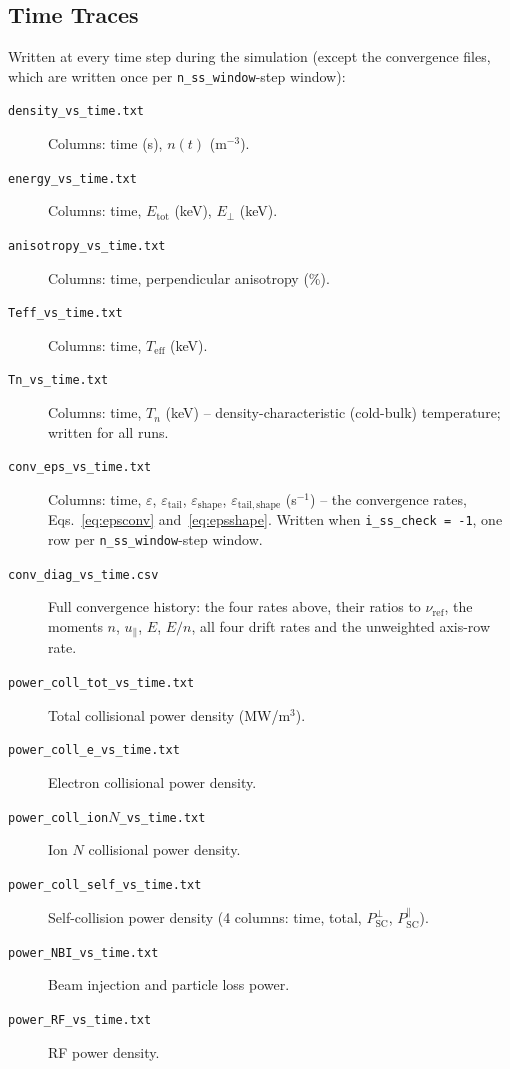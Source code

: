 \documentclass[11pt,a4paper]{article}
\begin{document}
\subsection{Time Traces}

Written at every time step during the simulation (except the convergence files,
which are written once per \texttt{n\_ss\_window}-step window):

\begin{description}
  \item[\texttt{density\_vs\_time.txt}] Columns: time (s), $n(t)$ (m$^{-3}$).
  \item[\texttt{energy\_vs\_time.txt}] Columns: time, $E_\mathrm{tot}$ (keV), $E_\perp$ (keV).
  \item[\texttt{anisotropy\_vs\_time.txt}] Columns: time, perpendicular anisotropy (\%).
  \item[\texttt{Teff\_vs\_time.txt}] Columns: time, $T_\mathrm{eff}$ (keV).
  \item[\texttt{Tn\_vs\_time.txt}] Columns: time, $T_n$ (keV) -- density-characteristic
        (cold-bulk) temperature; written for all runs.
  \item[\texttt{conv\_eps\_vs\_time.txt}] Columns: time, $\varepsilon$,
        $\varepsilon_\mathrm{tail}$, $\varepsilon_\mathrm{shape}$,
        $\varepsilon_\mathrm{tail,shape}$ (s$^{-1}$) -- the convergence rates,
        Eqs.~\eqref{eq:epsconv} and~\eqref{eq:epsshape}.  Written when
        \texttt{i\_ss\_check = -1}, one row per \texttt{n\_ss\_window}-step window.
  \item[\texttt{conv\_diag\_vs\_time.csv}] Full convergence history: the four rates
        above, their ratios to $\nu_\mathrm{ref}$, the moments $n$, $u_\parallel$,
        $E$, $E/n$, all four drift rates and the unweighted axis-row rate.
  \item[\texttt{power\_coll\_tot\_vs\_time.txt}] Total collisional power density (MW/m$^3$).
  \item[\texttt{power\_coll\_e\_vs\_time.txt}] Electron collisional power density.
  \item[\texttt{power\_coll\_ion$N$\_vs\_time.txt}] Ion $N$ collisional power density.
  \item[\texttt{power\_coll\_self\_vs\_time.txt}] Self-collision power density
        (4 columns: time, total, $P_\mathrm{SC}^\perp$, $P_\mathrm{SC}^\parallel$).
  \item[\texttt{power\_NBI\_vs\_time.txt}] Beam injection and particle loss power.
  \item[\texttt{power\_RF\_vs\_time.txt}] RF power density.

\end{description}
\end{document}
